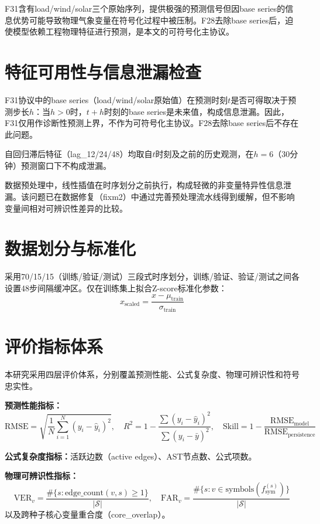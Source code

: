 \documentclass[12pt,a4paper,oneside]{ctexbook}
\newcommand{\VER}{\text{VER}}
\newcommand{\FAR}{\text{FAR}}
\newcommand{\RMSE}{\text{RMSE}}
\begin{document}
F31含有load/wind/solar三个原始序列，提供极强的预测信号但因base series的信息优势可能导致物理气象变量在符号化过程中被压制。F28去除base series后，迫使模型依赖工程物理特征进行预测，是本文的可符号化主协议。

\section{特征可用性与信息泄漏检查}
\label{sec:feature-audit}

F31协议中的base series（load/wind/solar原始值）在预测时刻$t$是否可得取决于预测步长$h$：当$h>0$时，$t+h$时刻的base series是未来值，构成信息泄漏。因此，F31仅用作诊断性预测上界，不作为可符号化主协议。F28去除base series后不存在此问题。

自回归滞后特征（lag\_12/24/48）均取自$t$时刻及之前的历史观测，在$h=6$（30分钟）预测窗口下不构成泄漏。

数据预处理中，线性插值在时序划分之前执行，构成轻微的非变量特异性信息泄漏。该问题已在数据修复（fixm2）中通过完善预处理流水线得到缓解，但不影响变量间相对可辨识性差异的比较。

\section{数据划分与标准化}

采用70/15/15（训练/验证/测试）三段式时序划分，训练/验证、验证/测试之间各设置48步间隔缓冲区。仅在训练集上拟合Z-score标准化参数：
\begin{equation}
x_{\text{scaled}} = \frac{x - \mu_{\text{train}}}{\sigma_{\text{train}}}
\end{equation}

\section{评价指标体系}

本研究采用四层评价体系，分别覆盖预测性能、公式复杂度、物理可辨识性和符号忠实性。

\textbf{预测性能指标：}
\begin{equation}
\RMSE = \sqrt{\frac{1}{N}\sum_{i=1}^{N}\left(y_i - \hat{y}_i\right)^2}, \quad
R^2 = 1 - \frac{\sum(y_i - \hat{y}_i)^2}{\sum(y_i - \bar{y})^2}, \quad
\text{Skill} = 1 - \frac{\RMSE_{\text{model}}}{\RMSE_{\text{persistence}}}
\end{equation}

\textbf{公式复杂度指标：}活跃边数（active edges）、AST节点数、公式项数。

\textbf{物理可辨识性指标：}
\begin{equation}
\VER_v = \frac{\#\{s : \text{edge\_count}(v, s) \geq 1\}}{|\mathcal{S}|}, \quad
\FAR_v = \frac{\#\{s : v \in \text{symbols}(f_{\text{sym}}^{(s)})\}}{|\mathcal{S}|}
\end{equation}
以及跨种子核心变量重合度（core\_overlap）。
\end{document}
